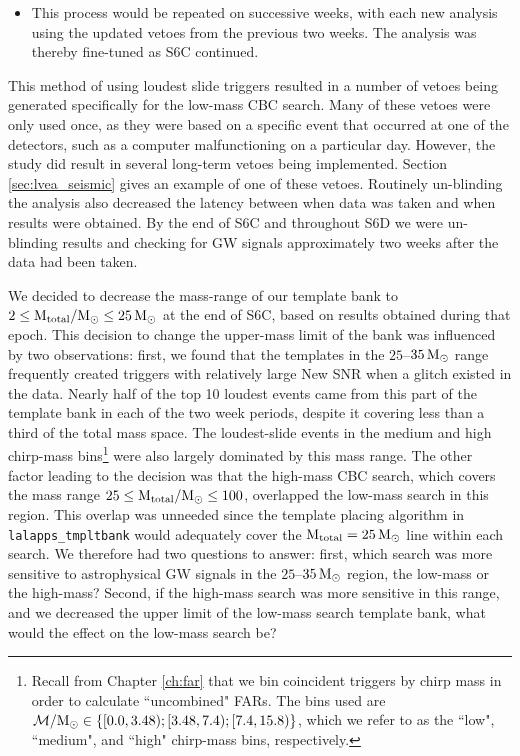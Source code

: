 \begin{itemize}
\item{This process would be repeated on successive weeks, with each new
analysis using the updated vetoes from the previous two weeks. The analysis was
thereby fine-tuned as S6C continued.}

\end{itemize}

This method of using loudest slide triggers resulted in a number of vetoes
being generated specifically for the low-mass \ac{CBC} search. Many of these
vetoes were only used once, as they were based on a specific event that
occurred at one of the detectors, such as a computer malfunctioning on a
particular day. However, the study did result in several long-term vetoes being
implemented. Section \ref{sec:lvea_seismic} gives an example of one of these
vetoes. Routinely un-blinding the analysis also decreased the latency between
when data was taken and when results were obtained. By the end of S6C and
throughout S6D we were un-blinding results and checking for GW signals
approximately two weeks after the data had been taken. 

We decided to decrease the mass-range of our template bank to $2 \leq
\mathrm{M_{total}}/\mathrm{M_\odot} \leq 25\,\mathrm{M_\odot}$ at the end of S6C, based on results obtained
during that epoch. This decision to change the upper-mass limit of the bank was
influenced by two observations: first, we found that the templates in the
$25$--$35\,\mathrm{M_\odot}$ range frequently created triggers with relatively large New
SNR when a glitch existed in the data. Nearly half of the top 10 loudest events
came from this part of the template bank in each of the two week periods,
despite it covering less than a third of the total mass space. The
loudest-slide events in the medium and high chirp-mass bins\footnote{Recall
from Chapter \ref{ch:far} that we bin coincident triggers by chirp mass in
order to calculate ``uncombined" FARs. The bins used are $\mathcal{M}/\mathrm{M_\odot} \in
\{ [0.0, 3.48); [3.48, 7.4); [7.4, 15.8) \}$, which we refer to as the ``low",
``medium", and ``high" chirp-mass bins, respectively.} were also largely
dominated by this mass range. The other factor leading to the decision was that
the high-mass \ac{CBC} search, which covers the mass range $25 \leq
\mathrm{M_{total}}/\mathrm{M_\odot} \leq 100$, overlapped the low-mass search in this region. This
overlap was unneeded since the template placing algorithm in
\texttt{lalapps\_tmpltbank} would adequately cover the $\mathrm{M_{total}} = 25\,\mathrm{M_\odot}$
line within each search. We therefore had two questions to answer: first, which
search was more sensitive to astrophysical GW signals in the $25$--$35\,\mathrm{M_\odot}$
region, the low-mass or the high-mass? Second, if the high-mass search was more
sensitive in this range, and we decreased the upper limit of the low-mass
search template bank, what would the effect on the low-mass search be?

